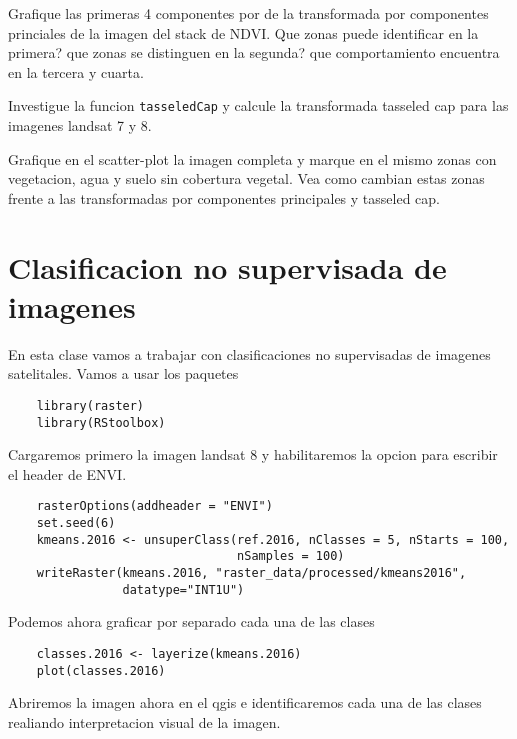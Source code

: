 \documentclass[a4paper]{article}
\begin{document}
\begin{act}
    Grafique las primeras 4 componentes por de la transformada por componentes
    princiales de la imagen del stack de NDVI\@. Que zonas puede identificar en la
    primera? que zonas se distinguen en la segunda? que comportamiento encuentra
    en la tercera y cuarta.
\end{act}

\begin{act}
    Investigue la funcion \texttt{tasseledCap} y calcule la transformada
    tasseled cap para las imagenes landsat 7 y 8.
\end{act}

\begin{act}
    Grafique en el scatter-plot la imagen completa y marque en el mismo zonas
    con vegetacion, agua y suelo sin cobertura vegetal. Vea como cambian estas
    zonas frente a las transformadas por componentes principales y tasseled cap.
\end{act}

\section{Clasificacion no supervisada de imagenes}
\label{sec:nosup}
En esta clase vamos a trabajar con clasificaciones no supervisadas de imagenes
satelitales. Vamos a usar los paquetes

\begin{lstlisting}
    library(raster)
    library(RStoolbox)
\end{lstlisting}

Cargaremos primero la imagen landsat 8 y habilitaremos la opcion para escribir
el header de ENVI.

\begin{lstlisting}
    rasterOptions(addheader = "ENVI")
    set.seed(6)
    kmeans.2016 <- unsuperClass(ref.2016, nClasses = 5, nStarts = 100,
                                nSamples = 100)
    writeRaster(kmeans.2016, "raster_data/processed/kmeans2016",
                datatype="INT1U")
\end{lstlisting}

Podemos ahora graficar por separado cada una de las clases

\begin{lstlisting}
    classes.2016 <- layerize(kmeans.2016)
    plot(classes.2016)
\end{lstlisting}

Abriremos la imagen ahora en el qgis e identificaremos cada una de las clases
realiando interpretacion visual de la imagen. 
\end{document}
